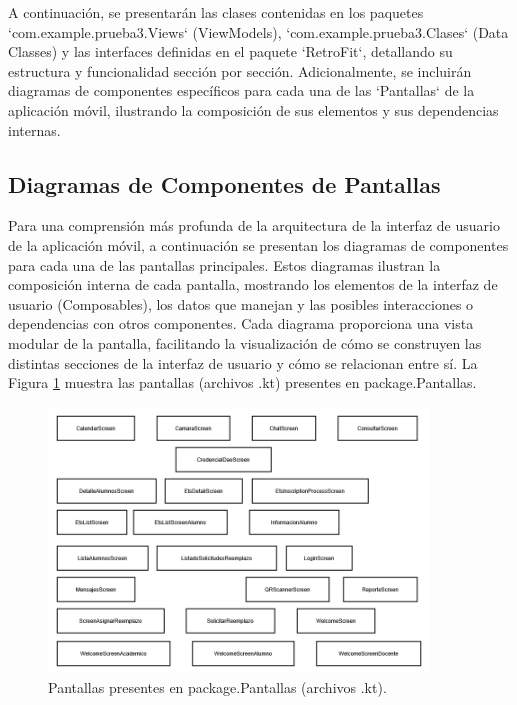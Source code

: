 A continuación, se presentarán las clases contenidas en los paquetes `com.example.prueba3.Views` (ViewModels), `com.example.prueba3.Clases` (Data Classes) y las interfaces definidas en el paquete `RetroFit`, detallando su estructura y funcionalidad sección por sección. Adicionalmente, se incluirán diagramas de componentes específicos para cada una de las `Pantallas` de la aplicación móvil, ilustrando la composición de sus elementos y sus dependencias internas.

\newpage

\subsection{Diagramas de Componentes de Pantallas}

Para una comprensión más profunda de la arquitectura de la interfaz de usuario de la aplicación móvil, a continuación se presentan los diagramas de componentes para cada una de las pantallas principales. Estos diagramas ilustran la composición interna de cada pantalla, mostrando los elementos de la interfaz de usuario (Composables), los datos que manejan y las posibles interacciones o dependencias con otros componentes. Cada diagrama proporciona una vista modular de la pantalla, facilitando la visualización de cómo se construyen las distintas secciones de la interfaz de usuario y cómo se relacionan entre sí. La Figura \ref{fig:Pantallas} muestra las pantallas (archivos .kt) presentes en package.Pantallas.

\begin{figure}[htbp!]
	\begin{center}
		\includegraphics[width=0.9\textwidth]{DiagramasMoviles/DCM (12)}
		\caption{Pantallas presentes en package.Pantallas (archivos .kt).}
		\label{fig:Pantallas}
	\end{center}
\end{figure}


